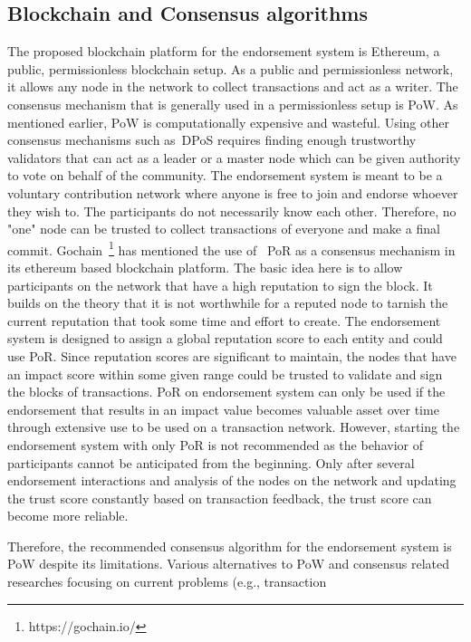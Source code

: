 \subsection{Blockchain and Consensus algorithms}\label{subsec:bcConsensus}
The proposed blockchain platform for the endorsement system is Ethereum, a
public, permissionless blockchain setup. As a public and permissionless
network, it allows any node in the network to collect transactions and act as a
writer. The consensus mechanism that is generally used in a permissionless
setup is \ac{PoW}. As mentioned earlier, \ac{PoW} is computationally expensive
and wasteful. Using other consensus mechanisms such as~\ac{DPoS} requires
finding enough trustworthy validators that can act as a leader or a master node
which can be given authority to vote on behalf of the community. The
endorsement system is meant to be a voluntary contribution network where anyone
is free to join and endorse whoever they wish to. The participants do not
necessarily know each other. Therefore, no "one" node can be trusted to collect
transactions of everyone and make a final commit.
Gochain~\footnote{https://gochain.io/} has mentioned the use of ~\ac{PoR} as a
consensus mechanism in its ethereum based blockchain platform. The basic idea
here is to allow participants on the network that have a high reputation to
sign the block. It builds on the theory that it is not worthwhile for a reputed
node to tarnish the current reputation that took some time and effort to
create. The endorsement system is designed to assign a global reputation score
to each entity and could use PoR. Since reputation scores are significant to
maintain, the nodes that have an impact score within some given range could be
trusted to validate and sign the blocks of transactions. PoR on endorsement
system can only be used if the endorsement that results in an impact value
becomes valuable asset over time through extensive use to be used on a
transaction network. However, starting the endorsement system with only PoR is
not recommended as the behavior of participants cannot be anticipated from the
beginning. Only after several endorsement interactions and analysis of the
nodes on the network and updating the trust score constantly based on
transaction feedback, the trust score can become more reliable. \par 
Therefore, the recommended consensus algorithm for the endorsement system is
\ac{PoW} despite its limitations. Various alternatives to \ac{PoW} and
consensus related researches focusing on current problems (e.g., transaction
